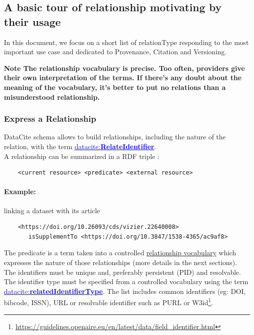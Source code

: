 \documentclass[11pt,a4paper]{ivoa}
\newcommand{\datacitedocurl}{https://datacite-metadata-schema.readthedocs.io/en/4.6}
\newcommand{\datacitepropurl}[1]{\datacitedocurl/properties/#1}
\newcommand{\dataciteterm}[1]{\textcolor{blue}{\mbox{datacite:\textbf{#1}}}}
\newcommand{\datacitetag}[2]{\href{\datacitepropurl{#1}}{\textcolor{blue}{\mbox{datacite:\textbf{#2}}}}}
\newcommand{\important}[1]{\textbf{\color{ivoacolor}Note #1 \\ }}
\begin{document}
\subsection{A basic tour of relationship motivating by their usage}\hypertarget{a-basic-tour-of-relationship-motivating-by-their-usage}{}\label{sec:a-basic-tour-of-relationship-motivating-by-their-usage}

In this document, we focus on a short list of relationType responding to the most important use case and dedicated to Provenance, Citation and Versioning.

\important{The relationship vocabulary is precise. Too often, providers give their own interpretation of the terms. If there's any doubt about the meaning of the vocabulary, it's better to put no relations than a misunderstood relationship.}

\subsubsection{Express a Relationship}
DataCite schema allows to build relationships, including the nature of the relation, with the term \datacitetag{relatedidentifier}{RelateIdentifier}.\\

A relationship can be summarized in a RDF triple :

\begin{lstlisting}
    <current resource> <predicate> <external resource>
\end{lstlisting}

\paragraph{Example: }  linking a dataset with its article 
\begin{lstlisting}
    <https://doi.org/10.26093/cds/vizier.22640008>  
       isSupplementTo <https://doi.org/10.3847/1538-4365/ac9af8>
\end{lstlisting}

The predicate is a term taken into a controlled \href{\datacitepropurl/relatedidentifier/\#b-relationtype}{relationship vocabulary} which expresses the nature of those relationships (more details in the next sections). \\


The identifiers must be unique and, preferably persistent (PID) and resolvable. 
The identifier type must be specified from a controlled vocabulary using the term \href{\datacitepropurl/relatedidentifier/#a-relatedidentifiertype}{\dataciteterm{relatedIdentifierType}}. The list includes common identifiers (eg: DOI, bibcode, ISSN), URL or resolvable identifier such as PURL or W3id\footnote{\url{https://guidelines.openaire.eu/en/latest/data/field_identifier.html}}.
\end{document}

